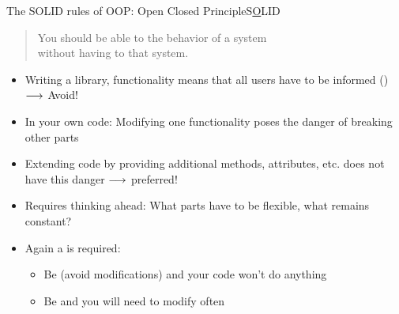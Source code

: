 \begin{frame}{The SOLID rules of OOP: Open Closed Principle}{S\underline  OLID}
	\begin{quote}
		You should be able to  the behavior of a system\\
		without having to  that system.
	\end{quote}

	\begin{itemize}
		\item<2-> Writing a library,  functionality means that all users have to be informed () $\longrightarrow$ Avoid!
		\item<2-> In your own code: Modifying one functionality  poses the danger of breaking other parts 
		\item<3-> Extending code by providing additional methods, attributes, etc. does not have this danger $\longrightarrow$ preferred!
		\item<4-> Requires thinking ahead: What parts have to be flexible, what remains constant?
		\item<4-> Again a  is required:
		\begin{itemize}
			\item Be  (avoid modifications) and your code won't do anything
			\item Be  and you will need to modify  often
		\end{itemize}
	\end{itemize}
\end{frame}

